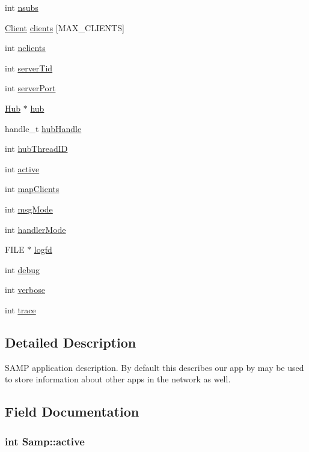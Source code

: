 \begin{CompactItemize}
\item 
int \hyperlink{structSamp_36f4cfae3407b8961e57a77abca7d599}{nsubs}
\item 
\hyperlink{structClient}{Client} \hyperlink{structSamp_2cc1f00b9e4bae456e0e72b90147df7b}{clients} \mbox{[}MAX\_\-CLIENTS\mbox{]}
\item 
int \hyperlink{structSamp_97ef8ad57159f4b6c4fcd93a12853b69}{nclients}
\item 
int \hyperlink{structSamp_69b05b2fa1ab19729d81659ad64387a0}{serverTid}
\item 
int \hyperlink{structSamp_8849cb13cbedae805b4e35327bc449e2}{serverPort}
\item 
\hyperlink{structHub}{Hub} $\ast$ \hyperlink{structSamp_14811ec2253a6e2e75a8ec863c4150b0}{hub}
\item 
handle\_\-t \hyperlink{structSamp_03918136809ece7e60de4e30c64b6224}{hubHandle}
\item 
int \hyperlink{structSamp_723b2538cfd65122c49783b36a7d30b5}{hubThreadID}
\item 
int \hyperlink{structSamp_32402da48b11693c13252edbdca7673c}{active}
\item 
int \hyperlink{structSamp_c8eee2b56f226f59d814fd1baa751b77}{mapClients}
\item 
int \hyperlink{structSamp_30ca22535582e7bf6416627d1cd46525}{msgMode}
\item 
int \hyperlink{structSamp_14f6ed59a947504d37bd8cdd1f2f8e8d}{handlerMode}
\item 
FILE $\ast$ \hyperlink{structSamp_79f2ee1f48cb40edaf9b63ccdbb6942f}{logfd}
\item 
int \hyperlink{structSamp_d8469d2447cd872101fb83d92f85049e}{debug}
\item 
int \hyperlink{structSamp_981b01bd09deddb039db3567825bd653}{verbose}
\item 
int \hyperlink{structSamp_25ddaf846639c7c67ea651a578b804ad}{trace}
\end{CompactItemize}


\subsection{Detailed Description}
SAMP application description. By default this describes our app by may be used to store information about other apps in the network as well. 

\subsection{Field Documentation}
\hypertarget{structSamp_32402da48b11693c13252edbdca7673c}{
\subsubsection[{active}]{\setlength{\rightskip}{0pt plus 5cm}int {\bf Samp::active}}}
\label{structSamp_32402da48b11693c13252edbdca7673c}


